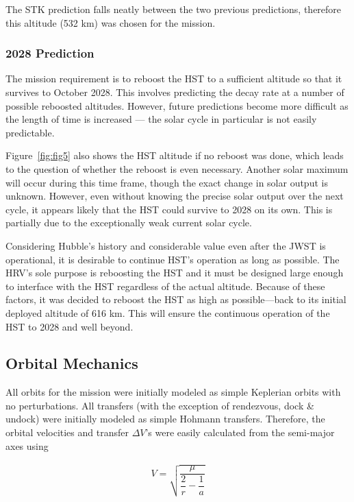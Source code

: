 \documentclass[paper=letter, fontsize=11pt]{scrartcl} %
\numberwithin{equation}{section} %
\numberwithin{figure}{section} %
\numberwithin{table}{section} %
\begin{document}
The STK prediction falls neatly between the two previous predictions, therefore this altitude (532 km) was chosen for the mission.


\subsubsection{2028 Prediction}

The mission requirement is to reboost the HST to a sufficient altitude so that it survives to October 2028. This involves predicting the decay rate at a number of possible reboosted altitudes. However, future predictions become more difficult as the length of time is increased --- the solar cycle in particular is not easily predictable.

Figure~\ref{fig:fig5} also shows the HST altitude if no reboost was done, which leads to the question of whether the reboost is even necessary. Another solar maximum will occur during this time frame, though the exact change in solar output is unknown. However, even without knowing the precise solar output over the next cycle, it appears likely that the HST could survive to 2028 on its own. This is partially due to the exceptionally weak current solar cycle.

Considering Hubble's history and considerable value even after the JWST is operational, it is desirable to continue HST's operation as long as possible. The HRV's sole purpose is reboosting the HST and it must be designed large enough to interface with the HST regardless of the actual altitude. Because of these factors, it was decided to reboost the HST as high as possible---back to its initial deployed altitude of 616 km. This will ensure the continuous operation of the HST to 2028 and well beyond.

\subsection{Orbital Mechanics}

All orbits for the mission were initially modeled as simple Keplerian orbits with no perturbations. All transfers (with the exception of rendezvous, dock \& undock) were initially modeled as simple Hohmann transfers. Therefore, the orbital velocities and transfer $\Delta V$'s were easily calculated from the semi-major axes using

\begin{align*}
    V = \sqrt{\dfrac{\mu}{\dfrac{2}{r}-\dfrac{1}{a}}}
\end{align*}
\end{document}
